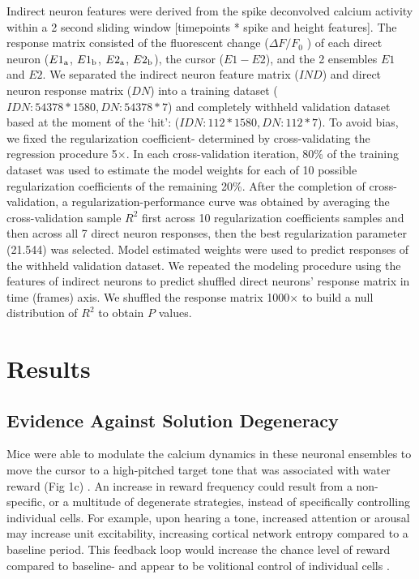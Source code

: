 \documentclass[letterpaper, 10 pt, conference]{ieeeconf}  %
\begin{document}
Indirect neuron features were derived from the spike deconvolved calcium activity within a 2 second sliding window [timepoints * spike and height features]. The response matrix consisted of the fluorescent change ($\Delta F/F_{0}$ ) of each direct neuron ($E1\textsubscript{a}$, $E1\textsubscript{b}$, $E2\textsubscript{a}$, $E2\textsubscript{b}$), the cursor ($E1-E2$), and the 2 ensembles $E1$ and $E2$.  We separated the indirect neuron feature matrix ($IND$) and direct neuron response matrix ($DN$) into a training dataset ($IDN: 54378 * 1580, DN: 54378 * 7$) and completely withheld validation dataset based at the moment of the `hit': ($IDN: 112 * 1580, DN: 112 * 7$).  To avoid bias, we fixed the regularization coefficient- determined by cross-validating the regression procedure 5$\times$. In each cross-validation iteration, 80\% of the training dataset was used to estimate the model weights for each of 10 possible regularization coefficients of the remaining 20\%. After the completion of cross-validation, a regularization-performance curve was obtained by averaging the cross-validation sample $R^2$ first across 10 regularization coefficients samples and then across all 7 direct neuron responses, then the best regularization parameter (21.544) was selected. Model estimated weights were used to predict responses of the withheld validation dataset.  We repeated the modeling procedure using the features of indirect neurons to predict shuffled direct neurons' response matrix in time (frames) axis. We shuffled the response matrix 1000$\times$  to build a null distribution of $R^2$ to obtain $P$ values\cite{Nunez-Elizalde2018-ia}.



\section{Results} 

\subsection{Evidence Against Solution Degeneracy}
	Mice were able to modulate the calcium dynamics in these neuronal ensembles to move the cursor to a high-pitched target tone that was associated with water reward (Fig 1c) \cite{Clancy2014-ju}. An increase in reward frequency could result from a non-specific, or a multitude of degenerate strategies, instead of specifically controlling individual cells. For example, upon hearing a tone, increased attention or arousal may increase unit excitability, increasing cortical network entropy compared to a baseline period. This feedback loop would increase the chance level of reward compared to baseline- and appear to be volitional control of individual cells \cite{Prsa2017-rn}.
\end{document}

